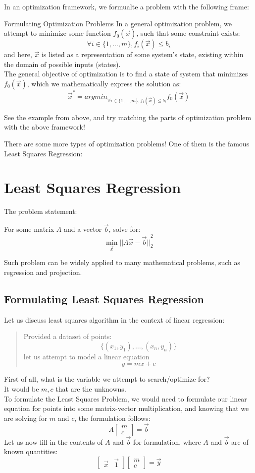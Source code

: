 In an optimization framework, we formualte a problem with the following frame:
\begin{ln-explain}{Formulating Optimization Problems}{}
    In a general optimization problem, we attempt to minimize some function $f_0(\vec{x})$, such that some constraint exists:
    \[\forall i \in \{1, \dots, m\}, f_i(\vec{x}) \leq b_i\]
    and here, $\vec{x}$ is listed as a representation of some system's state, existing within the domain of possible inputs (states). \\
    The general objective of optimization is to find a state of system that minimizes $f_0(\vec{x})$, which we mathematically express the solution as:
    \[\vec{x}^* = {argmin}_{\forall i \in \{1, \dots, m\}, f_i(\vec{x}) \leq b_i} f_0(\vec{x})\]
\end{ln-explain}
See the example from above, and try matching the parts of optimization problem with the above framework!

There are some more types of optimization problems! One of them is the famous Least Squares Regression:

\section{Least Squares Regression}
The problem statement:
\begin{center}
    For some matrix $A$ and a vector $\vec{b}$, solve for:
    \[\min_{\vec{x}} {\lvert\lvert A \vec{x} - \vec{b} \rvert\rvert}_2^2\]
\end{center}

Such problem can be widely applied to many mathematical problems, such as regression and projection.

\subsection{Formulating Least Squares Regression}
Let us discuss least squares algorithm in the context of linear regression:
\begin{quote}
    Provided a dataset of points:
    \[\{(x_1, y_1), \dots, (x_n, y_n)\}\]
    let us attempt to model a linear equation
    \[y = mx + c\]
\end{quote}
First of all, what is the variable we attempt to search/optimize for? \\
It would be $m, c$ that are the unknowns. \\
To formulate the Least Squares Problem, we would need to formulate our linear equation for points into some matrix-vector multiplication, and knowing that we are solving for $m$ and $c$, the formulation follows:
\[
    A
    \begin{bmatrix} m \\ c \end{bmatrix}
    = \vec{b}
\]
Let us now fill in the contents of $A$ and $\vec{b}$ for formulation, where $A$ and $\vec{b}$ are of known quantities:
\[
    \begin{bmatrix} \vec{x} & \vec{1} \end{bmatrix}
    \begin{bmatrix} m \\ c \end{bmatrix}
    = \vec{y}
\]

